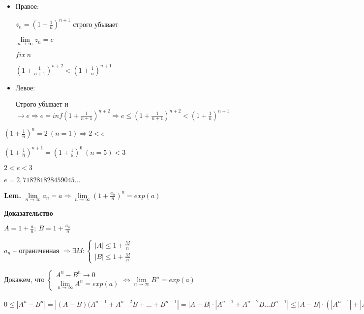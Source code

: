 \documentclass[14pt, letter paper]{article}
\begin{document}
\begin{enumerate}
    \begin{itemize}
        \item Правое:

        $z_n = (1 + \frac{1}{n})^{n+1}$ строго убывает

        $\lim\limits_{n \rightarrow \infty}{z_n} = e$

        $fix\ n$

        $(1 + \frac{1}{n+1})^{n+2} < (1 + \frac{1}{n})^{n+1}$

        \item Левое:

        Строго убывает и $\rightarrow e \Rightarrow e = inf(1 + \frac{1}{n+1})^{n+2} \Rightarrow e \leq (1 + \frac{1}{n+1})^{n+2} < (1 + \frac{1}{n})^{n+1}$
    \end{itemize}

    $(1 + \frac{1}{n})^n = 2\ (n = 1) \Rightarrow 2 < e$

    $(1 + \frac{1}{n})^{n+1} = (1 + \frac{1}{5})^6\ (n = 5) < 3$

    $2 < e < 3$

    $e = 2,718281828459045 \ldots$
\end{enumerate}

\textbf{Lem.} $\lim\limits_{n \rightarrow \infty}{a_n} = a \Rightarrow \lim\limits_{n \rightarrow \infty}{(1 + \frac{a_n}{n})^n} = exp(a)$

\begin{center}
    \textbf{Доказательство}
\end{center}

$A = 1 + \frac{a}{n};\ B = 1 + \frac{a_n}{n}$

$a_n$ -- ограниченная $\Rightarrow \exists M : \begin{cases}
    |A| \leq 1 + \frac{M}{n} \\
    |B| \leq 1 + \frac{M}{n}
\end{cases}$

Докажем, что $\begin{cases}
    A^n - B^n \rightarrow 0 \\
    \lim\limits_{n \rightarrow \infty}{A^n} = exp(a)
\end{cases} \Leftrightarrow \lim\limits_{n \rightarrow \infty}{B^n} = exp(a)$

$0 \leq |A^n - B^n| = |(A-B)(A^{n-1} + A^{n-2}B + \ldots + B^{n-1}| = |A-B| \cdot |A^{n-1} + A^{n-2}B \ldots B^{n-1}| \leq |A-B| \cdot (|A^{n-1}| + |A^{n-2}B| + \ldots + |B^{n-1}|) \leq |A - B| \cdot n(1 + \frac{M}{n})^{n-1} = |1 + \frac{a}{n} - 1 - \frac{a_n}{n}| \cdot n \cdot (1 + \frac{M}{n})^{n-1} = \frac{|a - a_n|}{n} \cdot n \cdot (1 + \frac{M}{n})^{n-1} = |a - a_n| \cdot (1 + \frac{M}{n})^{n-1}$
\end{document}
